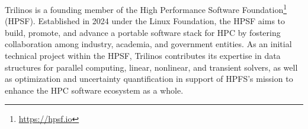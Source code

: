 Trilinos is a founding member of the High Performance Software Foundation\footnote{\url{https://hpsf.io}} (HPSF).
Established in 2024 under the Linux Foundation,
the HPSF aims to build, promote, and advance a portable software stack for HPC by fostering collaboration among industry, academia, and government entities.
As an initial technical project within the HPSF, Trilinos contributes its expertise in data structures for parallel computing, linear, nonlinear, and transient solvers,
as well as optimization and uncertainty quantification in support of HPFS’s mission to enhance the HPC software ecosystem as a whole.
